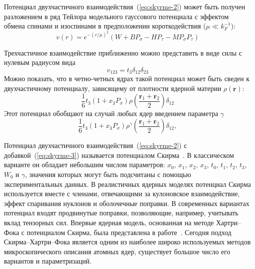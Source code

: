 Потенциал двухчастичного взаимодействия~(\ref{eq:skyrme-2}) может быть получен разложением в ряд Тейлора модельного гауссового потенциала с эффектом обмена спинами и изоспинами в предположении короткодействия ($\mu \ll k_F^{-1}$):
\begin{equation}
v(r) = e^{-(r/\mu)^2} (W + B P_\sigma - H P_\tau - M P_\sigma P_\tau)
\end{equation}

Трехчастичное взаимодействие приближенно можно представить в виде силы с нулевым радиусом вида
\begin{equation}
v_{123} = t_3 \delta_{12} \delta_{23}
\end{equation}
Можно показать, что в четно-четных ядрах такой потенциал может быть сведен к двухчастичному потенциалу, зависящему от плотности ядерной материи $\rho(\bm{r})$:
\begin{equation}
\displaystyle
\frac{1}{6} t_3 (1 + x_3 P_\sigma) 
\rho(\frac{\bm{r}_1 + \bm{r}_2}{2}) \delta_{12}
\end{equation}
Этот потенциал обобщают на случай любых ядер введением параметра $\gamma$
\begin{equation}
\displaystyle
\frac{1}{6} t_3 (1 + x_3 P_\sigma) 
\rho^\gamma(\frac{\bm{r}_1 + \bm{r}_2}{2}) \delta_{12},
\label{eq:skyrme-3}
\end{equation}

Потенциал двухчастичного взаимодействия~(\ref{eq:skyrme-2}) с добавкой~(\ref{eq:skyrme-3}) называется потенциалом Скирма~\cite{skyrme1958}. В классическом варианте он обладает небольшим числом параметров: $x_0$, $x_1$, $x_2$, $x_3$, $t_0$, $t_1$, $t_2$, $t_3$, $W_0$ и $\gamma$, значения которых могут быть подсчитаны с помощью экспериментальных данных. В реалистичных ядерных моделях потенциал Скирма используется вместе с членами, отвечающими за кулоновское взаимодействие, эффект спаривания нуклонов и оболочечные поправки. В современных вариантах потенциал входят продвинутые поправки, позволяющие, например, учитывать вклад тензорных сил. Впервые ядерная модель, основанная на методе Хартри--Фока с потенциалом Скирма, была представлена в работе~\cite{vautherin1972}. Сегодня подход Скирма--Хартри--Фока является одним из наиболее широко используемых методов микроскопического описания атомных ядер, существует большое число его вариантов и параметризаций.
